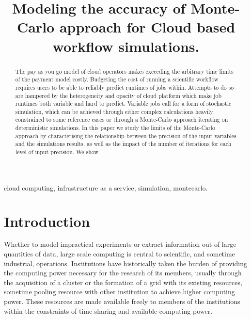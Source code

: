 \documentclass[10pt,conference,compsocconf]{IEEEtran}
\title{Modeling the accuracy of Monte-Carlo approach for Cloud based workflow simulations.}
\author{\IEEEauthorblockN{Luke~Bertot 
			and Stéphane~Genaud 
			and Julien~Gossa}
	\IEEEauthorblockA{Icube-ICPS --- UMR 7357, Univeristé de Strasbourg, CNRS\\
		P\^ole API Blvd S. Bant, 67400 Illkirch\\
		email: \url{lbertot@unistra.fr}, \url{gossa@unistra.fr}, \url{genaud@unistra.fr}}
	}
\begin{document}
\maketitle

\begin{abstract}
  The pay as you go model of  cloud operators makes exceeding the arbitrary time
  limits of the payment model costly. Budgeting the cost of running a scientific
  workflow  requires users  to  be able  to reliably  predict  runtimes of  jobs
  within. Attempts  to do so  are hampered by  the heterogeneity and  opacity of
  cloud  platform   which  make   job  runtimes  both   variable  and   hard  to
  predict. Variable jobs call for a  form of stochastic simulation, which can be
  achieved  through  either complex  calculations  heavily  constrained to  some
  reference cases or  through a Monte-Carlo approach  iterating on deterministic
  simulations. In this paper we study  the limits of the Monte-Carlo approach by
  characterising the relationship  between the precision of  the input variables
  and the simulations results, as well as the impact of the number of iterations
  for each level of input precision. We show.
\end{abstract}

\begin{IEEEkeywords}
cloud computing, infrastructure as a service, simulation, montecarlo.
\end{IEEEkeywords}

\section{Introduction}

Whether to  model impractical  experiments or extract  information out  of large
quantities of data, large scale computing is central to scientific, and sometime
industrial,  operations.  Institutions  have  historically taken  the burden  of
providing the computing power necessary for the research of its members, usually
through  the acquisition  of a  cluster  or the  formation  of a  grid with  its
existing resources, sometime pooling resource  with other institution to achieve
higher computing power.  These resources are made available freely to members of
the institutions within the constraints  of time sharing and available computing
power.
\end{document}
